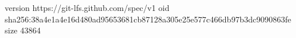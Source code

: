 version https://git-lfs.github.com/spec/v1
oid sha256:38a4e1a4e16d480ad95653681cb87128a305e25e577c466db97b3dc9090863fe
size 43864
